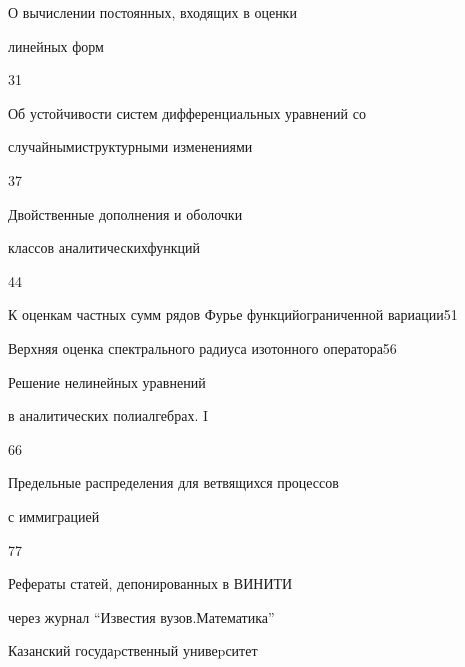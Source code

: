 

{О вычислении постоянных, входящих в оценки  


линейных форм}{31}




{Об устойчивости систем дифференциальных уравнений со 


случайными\newline структурными изменениями}{37}




{Двойственные дополнения и оболочки


классов аналитических\newline функций}{44}




{К оценкам частных сумм рядов Фурье функций\newline ограниченной вариации}{51}




{Верхняя оценка спектрального радиуса изотонного оператора}{56}




{Решение нелинейных уравнений 


в аналитических полиалгебрах. I}{66}




{Предельные распределения для ветвящихся процессов


с иммиграцией}{77}


\smallskip


\noindent Рефераты статей, депонированных в ВИНИТИ 


через журнал ``Известия вузов.\newline Математика''











\vfill


\noindent\raisebox{2pt}{\copyright} Казанский госудаpственный унивеpситет






